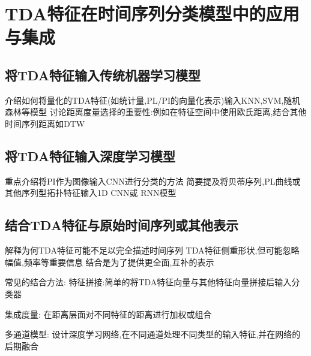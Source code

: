 \section{TDA特征在时间序列分类模型中的应用与集成}
\subsection{将TDA特征输入传统机器学习模型}
介绍如何将量化的TDA特征(如统计量,PL/PI的向量化表示)输入KNN,SVM,随机森林等模型
讨论距离度量选择的重要性:例如在特征空间中使用欧氏距离,结合其他时间序列距离如DTW

\subsection{将TDA特征输入深度学习模型}
重点介绍将PI作为图像输入CNN进行分类的方法
简要提及将贝蒂序列,PL曲线或其他序列型拓扑特征输入1D CNN或 RNN模型

\subsection{结合TDA特征与原始时间序列或其他表示}
解释为何TDA特征可能不足以完全描述时间序列
TDA特征侧重形状,但可能忽略幅值,频率等重要信息 
结合是为了提供更全面,互补的表示

常见的结合方法: 特征拼接:简单的将TDA特征向量与其他特征向量拼接后输入分类器

集成度量: 在距离层面对不同特征的距离进行加权或组合

多通道模型: 设计深度学习网络,在不同通道处理不同类型的输入特征,并在网络的后期融合

